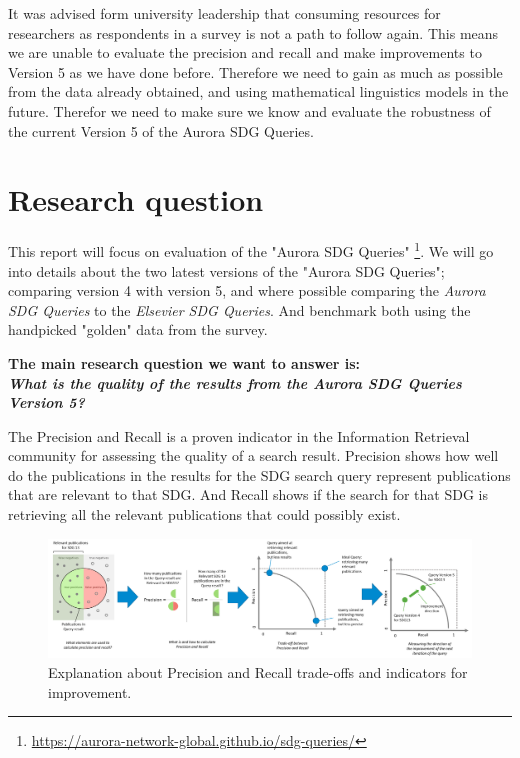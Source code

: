 \documentclass{article}
\begin{document}
It was advised form university leadership that consuming resources for researchers as respondents in a survey is not a path to follow again. This means we are unable to evaluate the precision and recall and make improvements to Version 5 as we have done before. Therefore we need to gain as much as possible from the data already obtained, and using mathematical linguistics models in the future. Therefor we need to make sure we know and evaluate the robustness of the current Version 5 of the Aurora SDG Queries.

\section{Research question}
\label{sec:research-question}

This report will focus on evaluation of the "Aurora SDG Queries" \footnote{\url{https://aurora-network-global.github.io/sdg-queries/} }. We will go into details about the two latest versions of the "Aurora SDG Queries"; comparing version 4 with version 5, and where possible comparing the \emph{Aurora SDG Queries} to the \emph{Elsevier SDG Queries}. And benchmark both using the handpicked "golden" data from the survey. 

\textbf{The main research question we want to answer is:  \\
\emph{What is the quality of the results from the Aurora SDG Queries Version 5?}}

The Precision and Recall is a proven indicator in the Information Retrieval community for assessing the quality of a search result. Precision shows how well do the publications in the results for the SDG search query represent publications that are relevant to that SDG. And Recall shows if the search for that SDG is retrieving all the relevant publications that could possibly exist.

\begin{figure}[ht]
	\centering
  \includegraphics[width=1.0\textwidth]{figures/recall-precision.png}
	\caption{Explanation about Precision and Recall trade-offs and indicators for improvement.}
	\label{precisonandrecallexplanation}
\end{figure}
\end{document}
